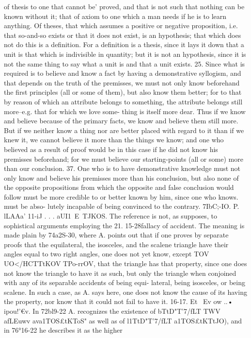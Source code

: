 {{of thesis to one that cannot be' proved, and that is not such that
nothing can be known without it; that of axiom to one which
a man needs if he is to learn anything. Of theses, that which
assumes a positive or negative proposition, i.e. that so-and-so
exists or that it does not exist, is an hypothesis; that which does
not do this is a definition. For a definition is a thesis, since it
lays it down that a unit is that which is indivisible in quantity;
but it is not an hypothesis, since it is not the same thing to say
what a unit is and that a unit exists.
25. Since what is required is to believe and know a fact by
having a demonstrative syllogism, and that depends on the truth
of the premisses, we must not only know beforehand the first
principles (all or some of them), but also know them better; for
to that by reason of which an attribute belongs to something,
the attribute belongs still more--e.g. that for which we love some-
thing is itself more dear. Thus if we know and believe because
of the primary facts, we know and believe them still more. But
if we neither know a thing nor are better placed with regard
to it than if we knew it, we cannot believe it more than the
things we know; and one who believed as a result of proof would
be in this case if he did not know his premisses beforehand; for
we must believe our starting-points (all or some) more than our
conclusion.
37. One who is to have demonstrative knowledge must not
only know and believe his premisses more than his conclusion,
but also none of the opposite propositions from which the
opposite and false conclusion would follow must be more credible
to or better known by him, since one who knows. must be abso-
lutely incapable of being convinced to the contrary.
7IbC;-IO.
P.
lLAAa' 11-iJ . . . aUI1~E~TJKOS. The reference is not, as
supposes, to sophistical arguments employing the
21. 15-28fallacy of accident. The meaning is made plain by 74a2S-30,
where A. points out that if one proves by separate proofs that the
equilateral, the isosceles, and the scalene triangle have their angles
equal to two right angles, one does not yet know, except TOV
UO</HCTTtKOV TPo-rrOV, that the triangle has that property, since one
does not know the triangle to have it as such, but only the triangle
when conjoined with any of its separable accidents of being equi-
lateral, being isosceles, or being scalene. In such a case, as A. says
here, one does not know the cause of its having the property,
nor know that it could not fail to have it.
16-17. Et ~Ev ow ..• ipou!'€v. In 72bl9-22 A. recognizes the
existence of bTtD"T'7/fLT} TWV afLEuwv ava1TOS£tKToS" as well as of
l1TtD"T'7/fLT} a1TOS£tKTtJO), and in 76°16-22 he describes it as the higher
